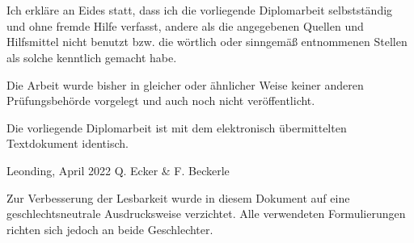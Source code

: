 \thispagestyle{empty}
\vspace{3cm}
~ \\ \\
Ich erkläre an Eides statt, dass ich die vorliegende Diplomarbeit selbstständig und ohne fremde Hilfe verfasst, andere als die angegebenen Quellen und Hilfsmittel nicht benutzt bzw. die wörtlich oder sinngemäß entnommenen Stellen als solche kenntlich gemacht habe.

Die Arbeit wurde bisher in gleicher oder ähnlicher Weise keiner anderen Prüfungsbehörde vorgelegt und auch noch nicht veröffentlicht.

Die vorliegende Diplomarbeit ist mit dem elektronisch übermittelten Textdokument identisch.
\vspace{3cm}
\begin{tabbing}
Leonding, April 2022 \hspace{5cm} Q. Ecker \& F. Beckerle
\end{tabbing}
\vspace{10cm}
Zur Verbesserung der Lesbarkeit wurde in diesem Dokument auf eine geschlechtsneutrale Ausdrucksweise verzichtet.
Alle verwendeten Formulierungen richten sich jedoch an beide Geschlechter.
\newpage
\setcounter{page}{1}
